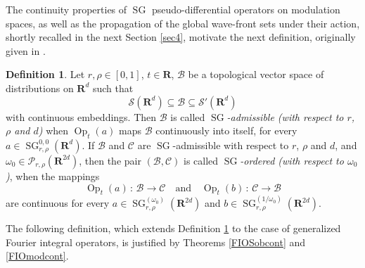 \documentclass[12pt,a4paper,reqno]{amsart}
\numberwithin{equation}{section}
\numberwithin{thm}{section}
\theoremstyle{definition}
\newtheorem{defn}[thm]{Definition}
\theoremstyle{remark}
\begin{document}
\par

The continuity properties of ${\operatorname{SG}}$ pseudo-differential operators on
modulation spaces, as well as the propagation of the global
wave-front sets under their action, shortly recalled in the next
Section \ref{sec4}, motivate the next definition, originally given in \cite{CJT2}. 

\par

\begin{defn}\label{def:admspace}
Let $r,\rho \in [0,1]$, $t\in \mathbf R$, ${{\mathcal B}}$ be a topological vector space
of distributions on ${\mathbf R^{d}}$ such that
$$
\mathscr S({\mathbf R^{d}})\subseteq {{\mathcal B}}  \subseteq \mathscr S'({\mathbf R^{d}})
$$
with continuous embeddings. Then ${{\mathcal B}}$ is called \emph{${\operatorname{SG}}$-admissible
(with respect to $r$, $\rho$ and $d$)} when ${\operatorname{Op}} _t(a)$ maps ${{\mathcal B}}$ continuously
into itself, for every $a\in {\operatorname{SG}} ^{0,0}_{r,\rho}({\mathbf R^{{d}}})$.
If ${{\mathcal B}}$ and ${{\mathcal C}}$ are ${\operatorname{SG}}$-admissible with respect to $r$, $\rho$ and $d$,
and $\omega _0\in \mathscr P_{r,\rho}({\mathbf R^{{2d}}})$, then the pair $({{\mathcal B}} ,{{\mathcal C}} )$ is
called \emph{${\operatorname{SG}}$-ordered (with respect to $\omega _0$)}, when the mappings
$$
{\operatorname{Op}} _t(a)\, :\, {{\mathcal B}} \to {{\mathcal C}} \quad \text{and}\quad {\operatorname{Op}} _t(b)\, :\, {{\mathcal C}} \to {{\mathcal B}}
$$
are continuous for every $a\in {\operatorname{SG}} ^{(\omega _0)}_{r,\rho}({\mathbf R^{{2d}}})$ and
$b\in {\operatorname{SG}} ^{(1/\omega _0)}_{r,\rho}({\mathbf R^{{2d}}})$.
\end{defn}

The following definition, which extends Definition \ref{def:admspace} to the case of
generalized Fourier integral operators, is justified by Theorems \ref{FIOSobcont}
and \ref{FIOmodcont}.

\par
\end{document}
